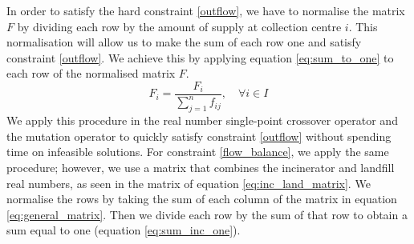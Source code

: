 \documentclass[mscthesis, 11pt]{usiinfthesis}
\theoremstyle{newdefinition}
\begin{document}
In order to satisfy the hard constraint \ref{outflow}, we have to normalise the matrix $F$ by dividing each row by the amount of supply at collection centre $i$. This normalisation will allow us to make the sum of each row one and satisfy constraint \ref{outflow}. We achieve this by applying equation \ref{eq:sum_to_one} to each row of the normalised matrix $F$. 
\begin{equation}\label{eq:sum_to_one}
    F_i = \frac{F_{i}}{\sum_{j = 1}^{n} f_{ij}}, \quad \forall i \in I
\end{equation}
We apply this procedure in the real number single-point crossover operator and the mutation operator to quickly satisfy constraint \ref{outflow} without spending time on infeasible solutions.
For constraint \ref{flow_balance}, we apply the same procedure; however, we use a matrix that combines the incinerator and landfill real numbers, as seen in the matrix of equation \ref{eq:inc_land_matrix}. We normalise the rows by taking the sum of each column of the matrix in equation \ref{eq:general_matrix}. Then we divide each row by the sum of that row to obtain a sum equal to one (equation \ref{eq:sum_inc_one}). 
\end{document}
